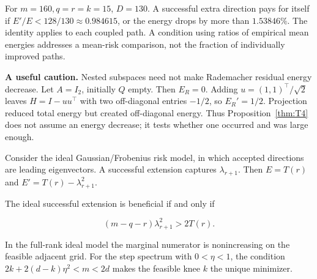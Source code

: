 For $m=160,q=r=k=15$, $D=130$. A successful extra direction pays for itself if $E'/E<128/130\approx0.984615$, or the energy drops by more than $1.53846\%$. The identity applies to each coupled path. A condition using ratios of empirical mean energies addresses a mean-risk comparison, not the fraction of individually improved paths.


\textbf{A useful caution.} Nested subspaces need not make Rademacher residual energy decrease. Let $A=I_2$, initially $Q$ empty. Then $E_R=0$. Adding $u=(1,1)^\top/\sqrt2$ leaves $H=I-uu^\top$ with two off-diagonal entries $-1/2$, so $E_R'=1/2$. Projection reduced total energy but created off-diagonal energy. Thus Proposition~\ref{thm:T4} does not assume an energy decrease; it tests whether one occurred and was large enough.

\begin{corollary}\label{cor:ideal}
Consider the ideal Gaussian/Frobenius risk model, in which accepted directions are leading eigenvectors. A successful extension captures $\lambda_{r+1}$. Then $E=T(r)$ and $E'=T(r)-\lambda_{r+1}^2$.


The ideal successful extension is beneficial if and only if


\begin{equation}
 (m-q-r)\lambda_{r+1}^2>2T(r). 
\end{equation}


In the full-rank ideal model the marginal numerator is nonincreasing on the
feasible adjacent grid. For the step spectrum with $0<\eta<1$, the condition
$2k+2(d-k)\eta^2<m<2d$ makes the feasible knee $k$ the unique minimizer.

\end{corollary}
